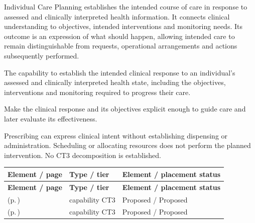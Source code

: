 Individual Care Planning establishes the intended course of care in response to assessed and clinically interpreted health information. It connects clinical understanding to objectives, intended interventions and monitoring needs. Its outcome is an expression of what should happen, allowing intended care to remain distinguishable from requests, operational arrangements and actions subsequently performed.



The capability to establish the intended clinical response to an individual's assessed and clinically interpreted health state, including the objectives, interventions and monitoring required to progress their care.



Make the clinical response and its objectives explicit enough to guide care and later evaluate its effectiveness.



Prescribing can express clinical intent without establishing dispensing or administration. Scheduling or allocating resources does not perform the planned intervention. No CT3 decomposition is established.


\begingroup\small\setlength{\TableWidth}{\dimexpr\linewidth-6\tabcolsep-4\arrayrulewidth\relax}
\begin{longtable}{|>{\raggedright\arraybackslash}p{0.52\TableWidth}|>{\raggedright\arraybackslash}p{0.2\TableWidth}|>{\raggedright\arraybackslash}p{0.28\TableWidth}|}
\hline\rowcolor{TableHead}\textbf{Element / page} & \textbf{Type / tier} & \textbf{Element / placement status}\\\hline\endfirsthead
\hline\rowcolor{TableHead}\textbf{Element / page} & \textbf{Type / tier} & \textbf{Element / placement status}\\\hline\endhead
\hline\endfoot
\nameref{cap:bc-care-goal-definition} (p.\,\pageref{cap:bc-care-goal-definition}) & capability CT3 & Proposed / Proposed\\\hline
\nameref{cap:bc-care-response-planning} (p.\,\pageref{cap:bc-care-response-planning}) & capability CT3 & Proposed / Proposed\\\hline
\end{longtable}\endgroup

